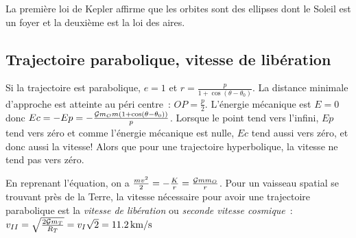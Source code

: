 La première loi de Kepler affirme que les orbites sont des ellipses dont le 
Soleil est un foyer et la deuxième est la loi des aires.

\subsection{Trajectoire parabolique, vitesse de libération}%

Si la trajectoire est parabolique, \(e=1\) et \(r = 
\frac{p}{1+\cos(\theta-\theta_0)}\). La distance minimale d'approche est %
atteinte au péri centre~: \(OP = \frac{p}{2}\). L'énergie mécanique est \(E=0\) 
donc \(Ec = -Ep = -\frac{\mathcal{G} m_O m(1+\cos(\theta - \theta_0))}{p}\). Lorsque le 
point tend vers l'infini, \(Ep\) tend vers zéro et comme l'énergie mécanique 
est nulle, \(Ec\) tend aussi vers zéro, et donc aussi la vitesse!
Alors que pour une trajectoire hyperbolique, la vitesse ne tend pas vers zéro.

En reprenant l'équation, on a \(\frac{mv^2}{2} = -\frac{K}{r} = \frac{\mathcal{G} m
m_O}{r}\). Pour un vaisseau spatial se trouvant près de la Terre, la vitesse 
nécessaire pour avoir une trajectoire parabolique est la \emph{vitesse de 
libération} ou \emph{seconde vitesse cosmique}~: \(v_{II} = \sqrt{\frac{2\mathcal{G} 
m_T}{R_T}} = v_{I} \sqrt{2} = \qty{11.2}{km/s}\)
